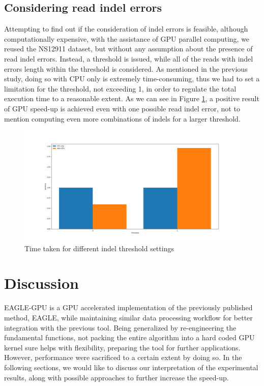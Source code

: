 \documentclass{PHlab-thesis}
\begin{document}
\section{Considering read indel errors}
Attempting to find out if the consideration of indel errors is feasible, although computationally expensive, with the assistance of GPU parallel computing, we reused the NS12911 dataset, but without any assumption about the presence of read indel errors. Instead, a threshold is issued, while all of the reads with indel errors length within the threshold is considered. As mentioned in the previous study, doing so with CPU only is extremely time-consuming, thus we had to set a limitation for the threshold, not exceeding 1, in order to regulate the total execution time to a reasonable extent. As we can see in Figure \ref{fig:readindel}, a positive result of GPU speed-up is achieved even with one possible read indel error, not to mention computing even more combinations of indels for a larger threshold.
\begin{figure}
	\centering
	\includegraphics[scale=0.3]{figures/read_indel.png}
	\caption{Time taken for different indel threshold settings}
	\label{fig:readindel} 
\end{figure}

\chapter{Discussion}
EAGLE-GPU is a GPU accelerated implementation of the previously published method, EAGLE, while maintaining similar data processing workflow for better integration with the previous tool. Being generalized by re-engineering the fundamental functions, not packing the entire algorithm into a hard coded GPU kernel sure helps with flexibility, preparing the tool for further applications. However, performance were sacrificed to a certain extent by doing so. In the following sections, we would like to discuss our interpretation of the experimental results, along with possible approaches to further increase the speed-up.
\end{document}
